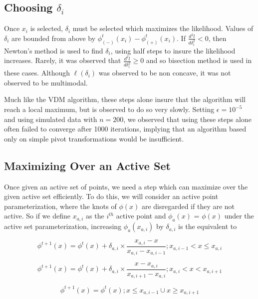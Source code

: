 \documentclass[10pt]{article}
\begin{document}
	{\subsection{Choosing $\delta_i$}} 
	
	Once $x_i$ is selected, $\delta_i$ must be selected which maximizes the likelihood. Values of $\delta_i$ are bounded from above by $\phi_{(-)}^t(x_i) - \phi_{(+)}^t(x_i)$. If $\frac{d^2l}{d\delta_i^2} < 0$, then Newton's method is used to find $\delta_i$, using half steps to insure the likelihood increases. Rarely, it was observed that $\frac{d^2l}{d\delta_i^2} \geq 0$ and so bisection method is used in these cases. Although $\ell(\delta_i)$ was observed to be non concave, it was not observed to be multimodal. 
	
	Much like the VDM algorithm, these steps alone insure that the algorithm will reach a local maximum, but is observed to do so very slowly. Setting $\epsilon = 10^{-5}$ and using simulated data with $n = 200$, we observed that using these steps alone often failed to converge after 1000 iterations, implying that an algorithm based only on simple pivot transformations would be insufficient. 
	
	{\subsection{Maximizing Over an Active Set} }
	
	Once given an active set of points, we need a step which can  maximize over the given active set efficiently. To do this, we will consider an active point parameterization, where the knots of $\phi(x)$ are disregarded if they are not active. So if we define $x_{a,i}$ as the $i^{th}$ active point and $\phi_a(x)$ = $\phi(x)$ under the active set parameterization, increasing $\phi_a(x_{a,i})$ by $\delta_{a,i}$ is the equivalent to
	
	\[ \phi^{t+1}(x) = \phi^t(x) + \delta_{a,i} \times \frac{x_{a,i} - x} { x_{a,i} - x_{a, i -1} } ; x_{a,i-1} < x \leq x_{a,i}
	\]
	
	\[ \phi^{t+1}(x) = \phi^t(x) + \delta_{a,i} \times \frac{ x - x_{a,i} } {x_{a, i + 1} - x_{a,i} } ; x_{a,i} < x < x_{a, i + 1} 
	\]
	
	\[ \phi^{t+1}(x)  = \phi^t(x) ; x \leq x_{a,i-1} \cup x \geq x_{a,i+1}
	\]
	
\end{document}
